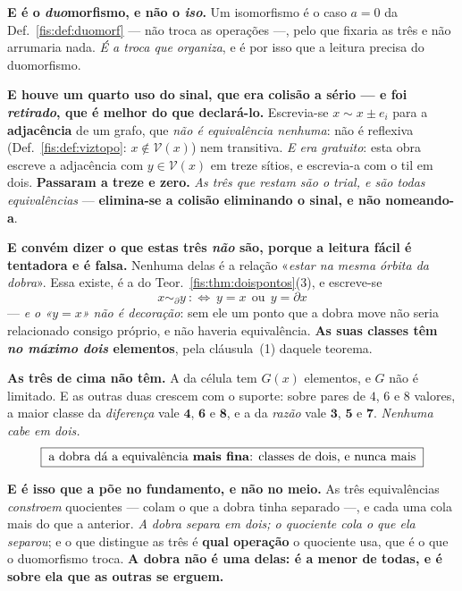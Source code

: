 \documentclass[livro.tex]{subfiles}
\begin{document}
\medskip\noindent\textbf{E é o \emph{duo}morfismo, e não o \emph{iso}.} Um
isomorfismo é o caso $a=0$ da Def.~\ref{fis:def:duomorf} --- não troca as
operações ---, pelo que fixaria as três e não arrumaria nada. \emph{É a troca que
organiza}, e é por isso que a leitura precisa do duomorfismo.

\medskip\noindent\textbf{E houve um quarto uso do sinal, que era colisão a sério ---
e foi \emph{retirado}, que é melhor do que declará-lo.} Escrevia-se
$x\sim x\pm e_i$ para a \textbf{adjacência} de um grafo, que \emph{não é
equivalência nenhuma}: não é reflexiva (Def.~\ref{fis:def:viztopo}:
$x\notin\mathcal V(x)$) nem transitiva. \emph{E era gratuito}: esta obra escreve a
adjacência com $y\in\mathcal{V}(x)$ em treze sítios, e escrevia-a com o til em
dois. \textbf{Passaram a treze e zero.} \emph{As três que restam são o trial, e são
todas equivalências} --- \textbf{elimina-se a colisão eliminando o sinal, e não
nomeando-a}.

\medskip\noindent\textbf{E convém dizer o que estas três \emph{não} são, porque a
leitura fácil é tentadora e é falsa.} Nenhuma delas é a relação «\emph{estar na
mesma órbita da dobra}». Essa existe, é a do
Teor.~\ref{fis:thm:doispontos}(3), e escreve-se
\[
x\sim_{\partial}y\ :\Longleftrightarrow\ y=x\ \ \text{ou}\ \ y=\partial x
\]
--- \emph{e o «$y=x$» não é decoração}: sem ele um ponto que a dobra move não
seria relacionado consigo próprio, e não haveria equivalência. \textbf{As suas
classes têm \emph{no máximo dois} elementos}, pela cláusula~(1) daquele teorema.

\medskip\noindent\textbf{As três de cima não têm.} A da célula tem $G(x)$
elementos, e $G$ não é limitado. E as outras duas crescem com o suporte: sobre
pares de $4$, $6$ e $8$ valores, a maior classe da \emph{diferença} vale
$\mathbf{4}$, $\mathbf{6}$ e $\mathbf{8}$, e a da \emph{razão} vale $\mathbf{3}$,
$\mathbf{5}$ e $\mathbf{7}$. \emph{Nenhuma cabe em dois.}
\[
\boxed{\;\text{a dobra dá a equivalência \textbf{mais fina}: classes de dois, e nunca mais}\;}
\]

\medskip\noindent\textbf{E é isso que a põe no fundamento, e não no meio.} As
três equivalências \emph{constroem} quocientes --- colam o que a dobra tinha
separado ---, e cada uma cola mais do que a anterior. \emph{A dobra separa em
dois; o quociente cola o que ela separou}; e o que distingue as três é
\textbf{qual operação} o quociente usa, que é o que o duomorfismo troca.
\textbf{A dobra não é uma delas: é a menor de todas, e é sobre ela que as outras
se erguem.}
\end{document}
